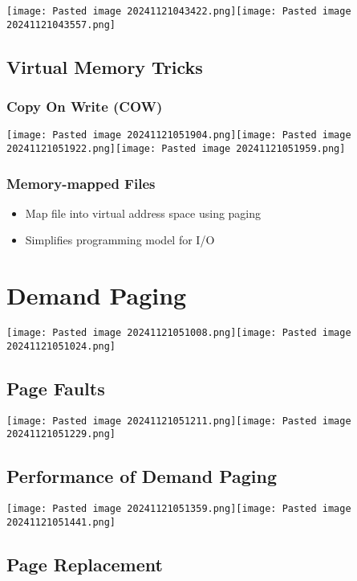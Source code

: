 \texttt{[image: Pasted image 20241121043422.png]}\texttt{[image: Pasted image 20241121043557.png]}

\subsection*{Virtual Memory Tricks}

\subsubsection*{Copy On Write (COW)}

\texttt{[image: Pasted image 20241121051904.png]}\texttt{[image: Pasted image 20241121051922.png]}\texttt{[image: Pasted image 20241121051959.png]}

\subsubsection*{Memory-mapped Files}

\begin{itemize}
\tightlist
\item
  Map file into virtual address space using paging
\item
  Simplifies programming model for I/O
\end{itemize}

\section*{Demand Paging}

\texttt{[image: Pasted image 20241121051008.png]}\texttt{[image: Pasted image 20241121051024.png]}

\subsection*{Page Faults}

\texttt{[image: Pasted image 20241121051211.png]}\texttt{[image: Pasted image 20241121051229.png]}

\subsection*{Performance of Demand Paging}

\texttt{[image: Pasted image 20241121051359.png]}\texttt{[image: Pasted image 20241121051441.png]}

\subsection*{Page Replacement}

